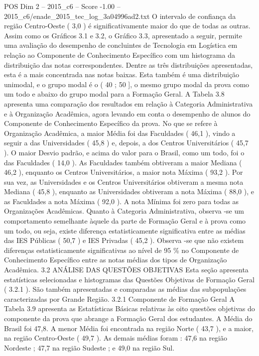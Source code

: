 \begin{textsample}{POS Dim 2 – 2015\_c6 – Score -1.00 – 2015\_c6/enade\_2015\_tec\_log\_3a04996ad2.txt}
O intervalo de confiança da região Centro-Oeste ( 3,0 ) é significativamente maior do que de todas as outras.
Assim como os Gráficos 3.1 e 3.2, o Gráfico 3.3, apresentado a seguir, permite uma avaliação do desempenho de concluintes de Tecnologia em Logística em relação ao Componente de Conhecimento Específico com um histograma da distribuição das notas correspondentes.
Dentre as três distribuições apresentadas, esta é a mais concentrada nas notas baixas.
Esta também é uma distribuição unimodal, e o grupo modal é o ( 40 ; 50 ], o mesmo grupo modal da prova como um todo e abaixo do grupo modal para a Formação Geral.
A Tabela 3.8 apresenta uma comparação dos resultados em relação à Categoria Administrativa e à Organização Acadêmica, agora levando em conta o desempenho de alunos do Componente de Conhecimento Específico da prova.
No que se refere à Organização Acadêmica, a maior Média foi das Faculdades ( 46,1 ), vindo a seguir a das Universidades ( 45,8 ) e, depois, a dos Centros Universitários ( 45,7 ).
O maior Desvio padrão, e acima do valor para o Brasil, como um todo, foi o das Faculdades ( 14,0 ).
As Faculdades também obtiveram a maior Mediana ( 46,2 ), enquanto os Centros Universitários, a maior nota Máxima ( 93,2 ).
Por sua vez, as Universidades e os Centros Universitários obtiveram a mesma nota Mediana ( 45,8 ), enquanto as Universidades obtiveram a nota Máxima ( 88,0 ), e as Faculdades a nota Máxima ( 92,0 ).
A nota Mínima foi zero para todas as Organizações Acadêmicas.
Quanto à Categoria Administrativa, observa -se um comportamento semelhante àquele da parte de Formação Geral e à prova como um todo, ou seja, existe diferença estatisticamente significativa entre as médias das IES Públicas ( 50,7 ) e IES Privadas ( 45,2 ).
Observa -se que não existem diferenças estatisticamente significativas ao nível de 95 \% no Componente de Conhecimento Específico entre as notas médias dos tipos de Organização Acadêmica. 3.2 ANÁLISE DAS QUESTÕES OBJETIVAS Esta seção apresenta estatísticas selecionadas e histogramas das Questões Objetivas de Formação Geral ( 3.2.1 ).
São também apresentadas e comparadas as médias das subpopulações caracterizadas por Grande Região. 3.2.1 Componente de Formação Geral A Tabela 3.9 apresenta as Estatísticas Básicas relativas às oito questões objetivas do componente da prova que abrange a Formação Geral dos estudantes.
A Média do Brasil foi 47,8.
A menor Média foi encontrada na região Norte ( 43,7 ), e a maior, na região Centro-Oeste ( 49,7 ).
As demais médias foram : 47,6 na região Nordeste ; 47,7 na região Sudeste ; e 49,0 na região Sul.

\end{textsample}
